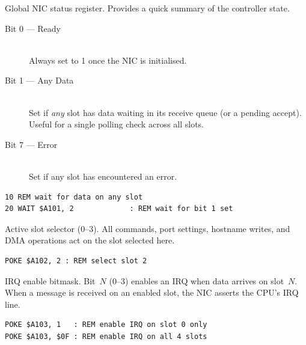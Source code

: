 

Global NIC status register.  Provides a quick summary of the controller state.


\begin{description}
  \item[Bit 0 --- Ready]\hfill\\
    Always set to 1 once the NIC is initialised.
  \item[Bit 1 --- Any Data]\hfill\\
    Set if \emph{any} slot has data waiting in its receive queue (or a pending
    accept).  Useful for a single polling check across all slots.
  \item[Bit 7 --- Error]\hfill\\
    Set if any slot has encountered an error.
\end{description}

\begin{lstlisting}
10 REM wait for data on any slot
20 WAIT $A101, 2             : REM wait for bit 1 set
\end{lstlisting}



Active slot selector (0--3).  All commands, port settings, hostname writes, and
DMA operations act on the slot selected here.

\begin{lstlisting}
POKE $A102, 2 : REM select slot 2
\end{lstlisting}



IRQ enable bitmask.  Bit~$N$ (0--3) enables an IRQ when data arrives on
slot~$N$.  When a message is received on an enabled slot, the NIC asserts the
CPU's IRQ line.


\begin{lstlisting}
POKE $A103, 1   : REM enable IRQ on slot 0 only
POKE $A103, $0F : REM enable IRQ on all 4 slots
\end{lstlisting}


